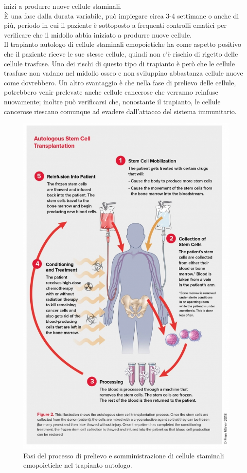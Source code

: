inizi a produrre nuove cellule staminali\cite{TRAPIANTO}.\\
È una fase dalla durata variabile, può impiegare circa 3-4 settimane o anche di più, periodo in cui il paziente 
è sottoposto a frequenti controlli ematici per verificare che il midollo abbia iniziato a produrre nuove cellule\cite{LLSBLOOD}.\\
Il trapianto autologo di cellule staminali emopoietiche ha come aspetto positivo che il paziente riceve le sue stesse cellule, quindi non c’è rischio di rigetto delle cellule trasfuse. 
Uno dei rischi di questo tipo di trapianto è però che le cellule trasfuse non vadano nel midollo osseo e non 
sviluppino abbastanza cellule nuove come dovrebbero. Un altro svantaggio è che nella fase di prelievo delle cellule, 
potrebbero venir prelevate anche cellule cancerose che verranno reinfuse nuovamente; inoltre  può verificarsi che, 
nonostante il trapianto, le cellule cancerose riescano comunque ad evadere dall’attacco del sistema immunitario\cite{STEMCELLS}.\\

\begin{figure}[H]
    \begin{center}
    \includegraphics[width=0.8\columnwidth]{img/AUTOLOGO.jpeg}
    \vspace{-3mm}
    \end{center}
    \caption{Fasi del processo di prelievo e somministrazione di cellule staminali emopoietiche nel trapianto autologo.
    \cite{LLSBLOOD}}
    \label{fig:FIGURE_3.15}
\end{figure}

